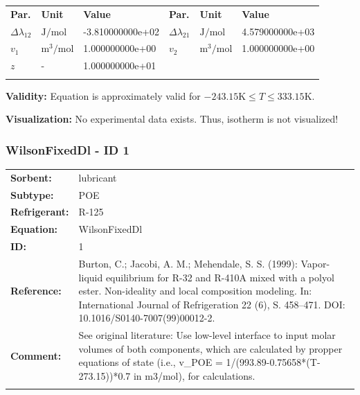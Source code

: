 \begin{longtable}[l]{lll|lll}
\toprule
\addlinespace
\textbf{Par.} & \textbf{Unit} & \textbf{Value} &	\textbf{Par.} & \textbf{Unit} & \textbf{Value} \\
\addlinespace
\midrule
\endhead

\bottomrule
\endfoot
\bottomrule
\endlastfoot
\addlinespace

$\Delta\lambda_{12}$ & $\si{\joule\per\mole}$ & -3.810000000e+02 & $\Delta\lambda_{21}$ & $\si{\joule\per\mole}$ & 4.579000000e+03 \\
$v_1$ & $\si{\cubic\meter\per\mole}$ & 1.000000000e+00 & $v_2$ & $\si{\cubic\meter\per\mole}$ & 1.000000000e+00 \\
$z$ & - & 1.000000000e+01 & & & \\

\addlinespace\end{longtable}

\textbf{Validity:}
\newline
Equation is approximately valid for $-243.15 \si{\kelvin} \leq T \leq 333.15 \si{\kelvin}$.
\newline

\textbf{Visualization:}
%
\newline
No experimental data exists. Thus, isotherm is not visualized!
%

\FloatBarrier
\newpage
\subsubsection{WilsonFixedDl - ID 1}
%
\begin{tabular}[l]{|lp{11.5cm}|}
\hline
\addlinespace

\textbf{Sorbent:} & lubricant \\
\textbf{Subtype:} & POE \\
\textbf{Refrigerant:} & R-125 \\
\textbf{Equation:} & WilsonFixedDl \\
\textbf{ID:} & 1 \\
\textbf{Reference:} & Burton, C.; Jacobi, A. M.; Mehendale, S. S. (1999): Vapor-liquid equilibrium for R-32 and R-410A mixed with a polyol ester. Non-ideality and local composition modeling. In: International Journal of Refrigeration 22 (6), S. 458–471. DOI: 10.1016/S0140-7007(99)00012-2. \\
\textbf{Comment:} & See original literature: Use low-level interface to input molar volumes of both components, which are calculated by propper equations of state (i.e., v\_POE =  1/(993.89-0.75658*(T-273.15))*0.7 in m3/mol), for calculations. \\

\addlinespace
\hline
\end{tabular}
\newline

